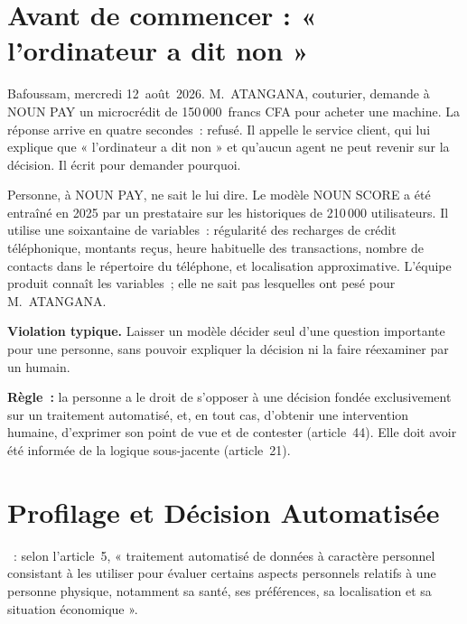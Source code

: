 \section*{Avant de commencer : « l'ordinateur a dit non »}

Bafoussam, mercredi 12~août~2026. M.~ATANGANA, couturier, demande à NOUN
PAY un microcrédit de 150\,000~francs CFA pour acheter une machine. La
réponse arrive en quatre secondes~: refusé. Il appelle le service client,
qui lui explique que « l'ordinateur a dit non » et qu'aucun agent ne peut
revenir sur la décision. Il écrit pour demander pourquoi.

Personne, à NOUN PAY, ne sait le lui dire. Le modèle NOUN SCORE a été
entraîné en 2025 par un prestataire sur les historiques de 210\,000
utilisateurs. Il utilise une soixantaine de variables~: régularité des
recharges de crédit téléphonique, montants reçus, heure habituelle des
transactions, nombre de contacts dans le répertoire du téléphone, et
localisation approximative. L'équipe produit connaît les variables~; elle
ne sait pas lesquelles ont pesé pour M.~ATANGANA.

\begin{boxalert}
\textbf{Violation typique.} Laisser un modèle décider seul d'une question
importante pour une personne, sans pouvoir expliquer la décision ni la
faire réexaminer par un humain.

\smallskip
\textbf{Règle~:} la personne a le droit de s'opposer à une décision fondée
exclusivement sur un traitement automatisé, et, en tout cas, d'obtenir une
intervention humaine, d'exprimer son point de vue et de contester
(article~44). Elle doit avoir été informée de la logique sous-jacente
(article~21).
\end{boxalert}

\section{Profilage et Décision Automatisée}
\label{sec:c14-definitions}

\begin{boxdef}
~: selon l'article~5, « traitement automatisé de données
à caractère personnel consistant à les utiliser pour évaluer certains
aspects personnels relatifs à une personne physique, notamment sa santé,
ses préférences, sa localisation et sa situation économique ».
\end{boxdef}

